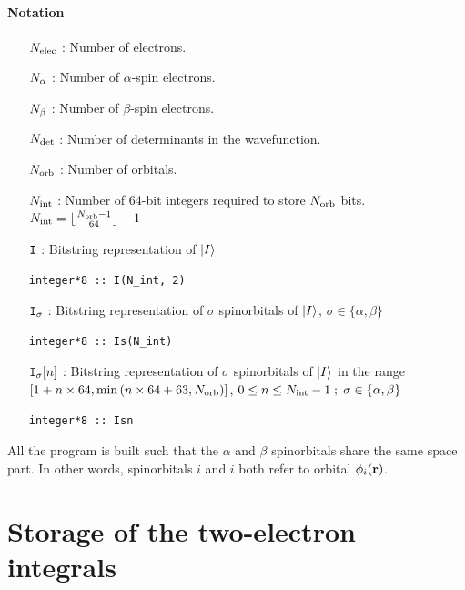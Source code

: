 \documentclass[./thesis.tex]{subfiles}
\begin{document}
\paragraph{Notation}
\begin{itemize}
	\item [${N_\text{elec}}$] : Number of electrons.
	\item [${N_\alpha}$] : Number of $\alpha$-spin electrons.
	\item [${N_\beta}$] : Number of $\beta$-spin electrons.
	\item [${N_\text{det}}$] : Number of determinants in the wavefunction.
	
	\item [${N_\text{orb}}$] : Number of orbitals.

	\item [${N_\text{int}}$] : Number of 64-bit integers required to store ${N_\text{orb}}$ bits.
        ${N_\text{int}} = \lfloor \frac{{N_\text{orb}}-1}{64} \rfloor + 1$
		
	\item [${\texttt{I}}$] : Bitstring representation of ${\ket{I}}$
\begin{lstlisting}
integer*8 :: I(N_int, 2)
\end{lstlisting}
	
	\item [${{\texttt{I}_{\sigma}}}$] : 
	Bitstring representation of $\sigma$ spinorbitals of ${\ket{I}}$, $\sigma \in \{\alpha, \beta\}$ 
\begin{lstlisting}
integer*8 :: Is(N_int)
\end{lstlisting}

	\item [ {${{\texttt{I}_{\sigma}}} [n] $} ] :
	Bitstring representation of $\sigma$ spinorbitals of ${\ket{I}}$ in the range $[ 1+n \times 64, \min \qty (n \times 64 + 63, {N_\text{orb}}) ]$, $0 \leq n \leq {N_\text{int}}-1 \; ;\; \sigma \in \{\alpha, \beta\}$
\begin{lstlisting}
integer*8 :: Isn
\end{lstlisting}

\end{itemize}

All the program is built such that the $\alpha$ and $\beta$ spinorbitals share the same space part. In other words, spinorbitals $i$ and $\bar{i}$ both refer to orbital $\phi_i({\mathbf{r}})$.


\section{Storage of the two-electron integrals}
\label{sec:integrals}
\end{document}
